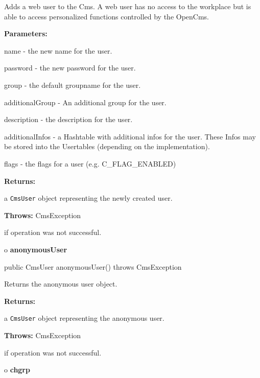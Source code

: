 \begin{description}
\htmlDD Adds a web user to the Cms. \htmlBR
A web user has no access to the workplace but is able to access personalized
functions controlled by the OpenCms. 

\begin{description}
\item {\bf Parameters:}  

name - the new name for the user.  

password - the new password for the user.  

group - the default groupname for the user.  

additionalGroup - An additional group for the user.  

description - the description for the user.  

additionalInfos - a Hashtable with additional infos for the user. These Infos
may be stored into the Usertables (depending on the implementation).  

flags - the flags for a user (e.g. C\_FLAG\_ENABLED)  
\item {\bf Returns:}  

a {\tt CmsUser} object representing the newly created user.  
\item {\bf Throws:} CmsException  

if operation was not successful.  
\end{description}

\end{description}

o {\bf anonymousUser} 

\begin{PRE}
 public CmsUser anonymousUser() throws CmsException
\end{PRE}

\begin{description}
\htmlDD Returns the anonymous user object. 

\begin{description}
\item {\bf Returns:}  

a {\tt CmsUser} object representing the anonymous user.  
\item {\bf Throws:} CmsException  

if operation was not successful.  
\end{description}

\end{description}

o {\bf chgrp} 

